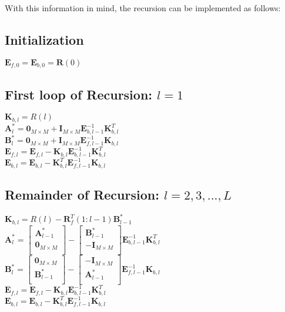 \documentclass{article}
\begin{document}
With this information in mind, the recursion can be implemented as follows:
\subsection{Initialization}
\begin{center}
  $\textbf{E}_{f,0} = \textbf{E}_{b,0} = \textbf{R}(0)$
\end{center}
\subsection{First loop of Recursion: $l=1$}
\begin{center}
  $\textbf{K}_{b,l} = R(l)$\\
  $\textbf{A}^{*}_{l} = \textbf{0}_{M \times M}+\textbf{I}_{M \times M}\textbf{E}^{-1}_{b,l-1}\textbf{K}^{T}_{b,l}$\\
  $\textbf{B}^{*}_{l} = \textbf{0}_{M \times M}+\textbf{I}_{M \times M}\textbf{E}^{-1}_{f,l-1}\textbf{K}_{b,l}$\\
  $\textbf{E}_{f,l} = \textbf{E}_{f,l}-\textbf{K}_{b,l}\textbf{E}^{-1}_{b,l-1}\textbf{K}^{T}_{b,l}$\\
  $\textbf{E}_{b,l} = \textbf{E}_{b,l}-\textbf{K}^{T}_{b,l}\textbf{E}^{-1}_{f,l-1}\textbf{K}_{b,l}$\\
\end{center}
\subsection{Remainder of Recursion: $l = 2, 3, ..., L$}
\begin{center}
  $\textbf{K}_{b,l} = R(l)-\textbf{R}^{T}_{f}(1:l-1)\textbf{B}^{*}_{l-1}$\\
  $\textbf{A}^{*}_{l} = \begin{bmatrix} \textbf{A}^{*}_{l-1}\\ \textbf{0}_{M \times M}\\ \end{bmatrix} - \begin{bmatrix} \textbf{B}^{*}_{l-1}\\ -\textbf{I}_{M \times M}\\ \end{bmatrix} \textbf{E}^{-1}_{b,l-1}\textbf{K}^{T}_{b,l}$\\
  $\textbf{B}^{*}_{l} = \begin{bmatrix} \textbf{0}_{M \times M}\\ \textbf{B}^{*}_{l-1}\\ \end{bmatrix} - \begin{bmatrix} -\textbf{I}_{M \times M}\\ \textbf{A}^{*}_{l-1}\\ \end{bmatrix}\textbf{E}^{-1}_{f,l-1}\textbf{K}_{b,l}$\\
  $\textbf{E}_{f,l} = \textbf{E}_{f,l}-\textbf{K}_{b,l}\textbf{E}^{-1}_{b,l-1}\textbf{K}^{T}_{b,l}$\\
  $\textbf{E}_{b,l} = \textbf{E}_{b,l}-\textbf{K}^{T}_{b,l}\textbf{E}^{-1}_{f,l-1}\textbf{K}_{b,l}$\\
\end{center}
\end{document}
